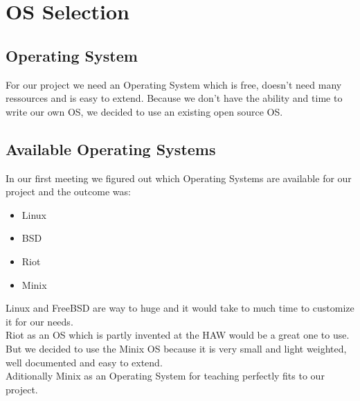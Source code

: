 
\chapter{OS Selection}

\section{Operating System}

For our project we need an Operating System which is free, doesn't need many ressources and is easy to extend. Because we don't have the ability and time to write our own OS, we decided to use an existing open source OS. 

\section{Available Operating Systems}

In our first meeting we figured out which Operating Systems are available for our project and the outcome was:
\begin{itemize}
	\item Linux
	\item BSD
	\item Riot
	\item Minix 
\end{itemize}
Linux and FreeBSD are way to huge and it would take to much time to customize it for our needs.\\
Riot as an OS which is partly invented at the HAW would be a great one to use.\\
But we decided to use the Minix OS because it is very small and light weighted, well documented and easy to extend.\\
Aditionally Minix as an Operating System for teaching perfectly fits to our project.

